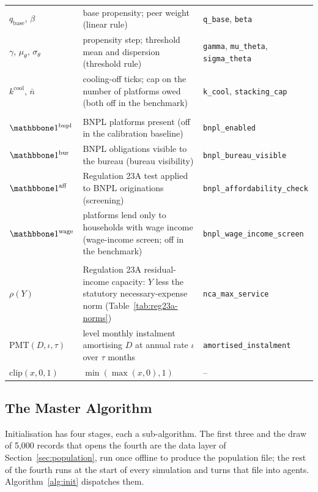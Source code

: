 \begin{longtable}{L{2.4cm}L{7.2cm}H{3.8cm}}
$q_{\text{base}}$, $\beta$ & base propensity; peer weight (linear rule) & \texttt{q\_base}, \texttt{beta} \\
$\gamma$, $\mu_\theta$, $\sigma_\theta$ & propensity step; threshold mean and dispersion (threshold rule) & \texttt{gamma}, \texttt{mu\_theta}, \texttt{sigma\_theta} \\
$k^{\text{cool}}$, $\bar n$ & cooling-off ticks; cap on the number of platforms owed (both off in the benchmark) & \texttt{k\_cool}, \texttt{stacking\_cap} \\
\addlinespace
{} \\
$\ind^{\text{bnpl}}$ & \ac{BNPL} platforms present (off in the calibration baseline) & \texttt{bnpl\_enabled} \\
$\ind^{\text{bur}}$ & \ac{BNPL} obligations visible to the bureau (bureau visibility) & \texttt{bnpl\_bureau\_visible} \\
$\ind^{\text{aff}}$ & Regulation 23A test applied to \ac{BNPL} originations (screening) & \texttt{bnpl\_affordability\_check} \\
$\ind^{\text{wage}}$ & platforms lend only to households with wage income (wage-income screen; off in the benchmark) & \texttt{bnpl\_wage\_income\_screen} \\
\addlinespace
{} \\
$\rho(Y)$ & Regulation 23A residual-income capacity: $Y$ less the statutory necessary-expense norm (Table~\ref{tab:reg23a-norms}) & \texttt{nca\_max\_service} \\
$\mathrm{PMT}(D, \iota, \tau)$ & level monthly instalment amortising $D$ at annual rate $\iota$ over $\tau$ months & \texttt{amortised\_instalment} \\
$\mathrm{clip}(x, 0, 1)$ & $\min(\max(x, 0), 1)$ & -- \\
\end{longtable}
\endgroup

\subsection{The Master Algorithm}\label{app:init-master}

Initialisation has four stages, each a sub-algorithm. The first three and the draw of 5{,}000
records that opens the fourth are the data layer of Section~\ref{sec:population}, run once
offline to produce the population file; the rest of the fourth runs at the start of every
simulation and turns that file into agents. Algorithm~\ref{alg:init} dispatches them.

